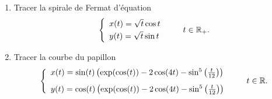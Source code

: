 \begin{frame}
\begin{tp}
\begin{enumerate}
  \item Tracer la spirale de Fermat d'équation
  $$\left\{
\begin{array}{l}
x(t)=\sqrt t \cos t\\[1mm]
y(t)=\sqrt t \sin t
\end{array}
\right. \qquad t \in \mathbb{R}_+.$$
  \item Tracer la courbe du papillon
  $$\left\{
\begin{array}{l}
x(t) = \sin(t)\left(\exp(\cos(t))-2\cos(4t)-\sin^5\left(\frac{t}{12}\right)\right)\\[3mm]
y(t) = \cos(t)\left(\exp(\cos(t))-2\cos(4t)-\sin^5\left(\frac{t}{12}\right)\right)
\end{array}
\right. \qquad t \in \mathbb{R}.$$
\end{enumerate} 
\end{tp}

\end{frame}


